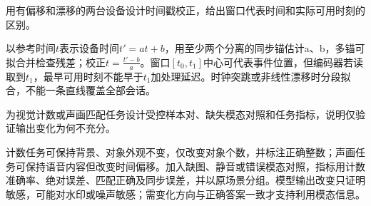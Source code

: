 \begin{exercises}
\begin{exercise}\optional 用有偏移和漂移的两台设备设计时间戳校正，给出窗口代表时间和实际可用时刻的区别。

\begin{solution}
以参考时间$t$表示设备时间$t'=a t+b$，用至少两个分离的同步锚估计a、b，多锚可拟合并检查残差；校正$t=\frac{t'-b}{a}$。窗口$[t_0,t_1]$中心可代表事件位置，但编码器若读取到$t_1$，最早可用时刻不能早于$t_1$加处理延迟。时钟突跳或非线性漂移时分段拟合，不能一条直线覆盖全部会话。
\end{solution}
\end{exercise}

\begin{exercise} 为视觉计数或声画匹配任务设计受控样本对、缺失模态对照和任务指标，说明仅验证输出变化为何不充分。

\begin{solution}
计数任务可保持背景、对象外观不变，仅改变对象个数，并标注正确整数；声画任务可保持语音内容但改变时间偏移。加入缺图、静音或错误模态对照，指标用计数准确率、绝对误差、匹配正确及同步误差，并以原场景分组。模型输出改变只证明敏感，可能对水印或噪声敏感；需变化方向与正确答案一致才支持利用模态信息。
\end{solution}
\end{exercise}

\end{exercises}
